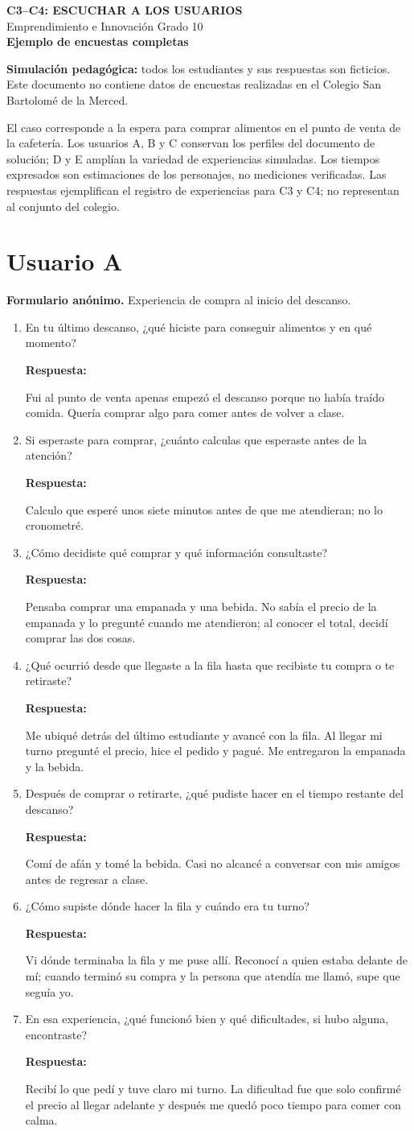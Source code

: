 \documentclass[12pt]{article}
\newcommand{\sol}[1]{{\color{solutionred}\small\strut #1\strut}}
\newcommand{\respuesta}[1]{\par\nopagebreak\textbf{Respuesta:} \sol{#1}}
\newcommand{\encuesta}[7]{%
\begin{enumerate}
\item En tu último descanso, ¿qué hiciste para conseguir alimentos y en qué momento?
\respuesta{#1}
\item Si esperaste para comprar, ¿cuánto calculas que esperaste antes de la atención?
\respuesta{#2}
\item ¿Cómo decidiste qué comprar y qué información consultaste?
\respuesta{#3}
\item ¿Qué ocurrió desde que llegaste a la fila hasta que recibiste tu compra o te retiraste?
\respuesta{#4}
\item Después de comprar o retirarte, ¿qué pudiste hacer en el tiempo restante del descanso?
\respuesta{#5}
\item ¿Cómo supiste dónde hacer la fila y cuándo era tu turno?
\respuesta{#6}
\item En esa experiencia, ¿qué funcionó bien y qué dificultades, si hubo alguna, encontraste?
\respuesta{#7}
\end{enumerate}}
\begin{document}
\color{black}
\begin{center}
{\Large\bfseries C3--C4: ESCUCHAR A LOS USUARIOS}\\[1mm]
Emprendimiento e Innovación Grado 10\\[1mm]
\textbf{Ejemplo de encuestas completas}
\end{center}
\textbf{Simulación pedagógica:} todos los estudiantes y sus respuestas son ficticios. Este documento no contiene datos de encuestas realizadas en el Colegio San Bartolomé de la Merced.

\smallskip
El caso corresponde a la espera para comprar alimentos en el punto de venta de la cafetería. Los usuarios A, B y C conservan los perfiles del documento de solución; D y E amplían la variedad de experiencias simuladas. Los tiempos expresados son estimaciones de los personajes, no mediciones verificadas. Las respuestas ejemplifican el registro de experiencias para C3 y C4; no representan al conjunto del colegio.

\section{Usuario A}
\textbf{Formulario anónimo.} Experiencia de compra al inicio del descanso.
\encuesta
{Fui al punto de venta apenas empezó el descanso porque no había traído comida. Quería comprar algo para comer antes de volver a clase.}
{Calculo que esperé unos siete minutos antes de que me atendieran; no lo cronometré.}
{Pensaba comprar una empanada y una bebida. No sabía el precio de la empanada y lo pregunté cuando me atendieron; al conocer el total, decidí comprar las dos cosas.}
{Me ubiqué detrás del último estudiante y avancé con la fila. Al llegar mi turno pregunté el precio, hice el pedido y pagué. Me entregaron la empanada y la bebida.}
{Comí de afán y tomé la bebida. Casi no alcancé a conversar con mis amigos antes de regresar a clase.}
{Vi dónde terminaba la fila y me puse allí. Reconocí a quien estaba delante de mí; cuando terminó su compra y la persona que atendía me llamó, supe que seguía yo.}
{Recibí lo que pedí y tuve claro mi turno. La dificultad fue que solo confirmé el precio al llegar adelante y después me quedó poco tiempo para comer con calma.}

\newpage
\end{document}
